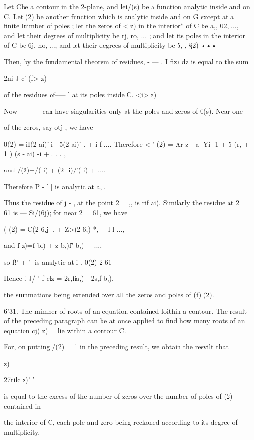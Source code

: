 {Let Cbe a contour in the 2-plane, and let/(s) be a function analytic
inside and on C. Let (2) be another function which is analytic inside
and on G except at a finite luimber of poles ; let the zeros of < z)
in the interior* of C be a,, 02, ..., and let their degrees of
multiplicity be rj, ro, ... ; and let its poles in the interior of C
be 6j, ho, ..., and let their degrees of multiplicity be 5, , §2) •••

Then, by the fundamental theorem of residues, - — . I fiz) dz is equal
to the sum

 2ni J c' (f> z)

of the residues of--— ' at its poles inside C. <i> z)

Now— —- - can have singularities only at the poles and zeros of 0(s).
Near one

of the zeros, say otj , we have

0(2) = iI(2-ai)'-i-|-5(2-ai)'-. + i-f-.... Therefore < ' (2) = Ar z -
a- Yi -1 + 5 (r, + 1 ) (s - ai) -i + . . . ,

and /(2)=/( i) + (2- i)/'( i) + ....

Therefore P - ' ] is analytic at a, .

Thus the residue of j - , at the point 2 = ,, is rif ai). Similarly
the residue at 2 = 61 is — Si/(6j); for near 2 = 61, we have

( (2) = C(2-6,j- . + Z>(2-6,)-*, + l-l-...,

and f z)=f bi) + z-b,)f' b,) + ...,

so f!' + '- is analytic at i . 0(2) 2-61

Hence i J/ ' f clz = 2r,fia,) - 2s,f b,),

the summations being extended over all the zeros and poles of (f) (2).

6'31. The mimher of roots of an equation contained loithin a contour.
The result of the preceding paragraph can be at once applied to find
how many roots of an equation cj) z) = lie within a contour C.

For, on putting /(2) = 1 in the preceding result, we obtain the
resvilt that



z)



27rilc z)' '

is equal to the excess of the number of zeros over the number of poles
of (2) contained in

the interior of C, each pole and zero being reckoned according to its
degree of multiplicity.

}
